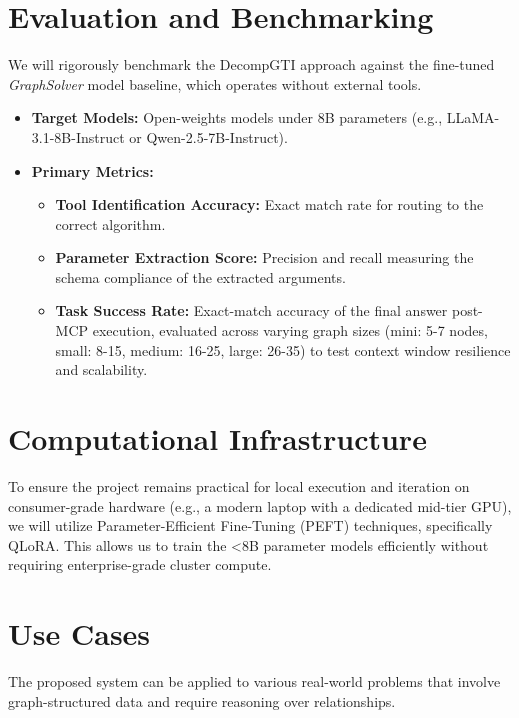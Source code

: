 \documentclass[11pt,a4paper]{article}
\begin{document}
\section{Evaluation and Benchmarking}
We will rigorously benchmark the DecompGTI approach against the fine-tuned \textit{GraphSolver} model baseline, which operates without external tools.
\begin{itemize}
    \item \textbf{Target Models:} Open-weights models under 8B parameters (e.g., LLaMA-3.1-8B-Instruct or Qwen-2.5-7B-Instruct).
    \item \textbf{Primary Metrics:}
    \begin{itemize}
        \item \textbf{Tool Identification Accuracy:} Exact match rate for routing to the correct algorithm.
        \item \textbf{Parameter Extraction Score:} Precision and recall measuring the schema compliance of the extracted arguments.
        \item \textbf{Task Success Rate:} Exact-match accuracy of the final answer post-MCP execution, evaluated across varying graph sizes (mini: 5-7 nodes, small: 8-15, medium: 16-25, large: 26-35) to test context window resilience and scalability.
    \end{itemize}
\end{itemize}

\section{Computational Infrastructure}
To ensure the project remains practical for local execution and iteration on consumer-grade hardware (e.g., a modern laptop with a dedicated mid-tier GPU), we will utilize Parameter-Efficient Fine-Tuning (PEFT) techniques, specifically QLoRA. This allows us to train the <8B parameter models efficiently without requiring enterprise-grade cluster compute.

\section{Use Cases}
The proposed system can be applied to various real-world problems that involve graph-structured data and require reasoning over relationships.
\end{document}
